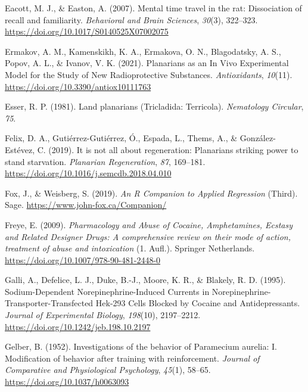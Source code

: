 \documentclass[
  jou,
  floatsintext,
  longtable,
  nolmodern,
  notxfonts,
  notimes,
  donotrepeattitle,
  colorlinks=true,linkcolor=blue,citecolor=blue,urlcolor=blue]{apa7}
\newlength{\cslhangindent}
\newenvironment{CSLReferences}[2] %
 {\begin{list}{}{%
  \setlength{\itemindent}{0pt}
  \setlength{\leftmargin}{0pt}
  \setlength{\parsep}{0pt}
  \ifodd #1
   \setlength{\leftmargin}{\cslhangindent}
   \setlength{\itemindent}{-1\cslhangindent}
  \fi
  \setlength{\itemsep}{#2\baselineskip}}}
 {\end{list}}
\begin{document}
\begin{CSLReferences}{1}{0}
Eacott, M. J., \& Easton, A. (2007). Mental time travel in the rat:
{Dissociation} of recall and familiarity. \emph{Behavioral and Brain
Sciences}, \emph{30}(3), 322--323.
\url{https://doi.org/10.1017/S0140525X07002075}

Ermakov, A. M., Kamenskikh, K. A., Ermakova, O. N., Blagodatsky, A. S.,
Popov, A. L., \& Ivanov, V. K. (2021). Planarians as an {In} {Vivo}
{Experimental} {Model} for the {Study} of {New} {Radioprotective}
{Substances}. \emph{Antioxidants}, \emph{10}(11).
\url{https://doi.org/10.3390/antiox10111763}

Esser, R. P. (1981). Land planarians ({Tricladida}: {Terricola}).
\emph{Nematology Circular}, \emph{75}.

Felix, D. A., Gutiérrez-Gutiérrez, Ó., Espada, L., Thems, A., \&
González-Estévez, C. (2019). It is not all about regeneration:
{Planarians} striking power to stand starvation. \emph{Planarian
Regeneration}, \emph{87}, 169--181.
\url{https://doi.org/10.1016/j.semcdb.2018.04.010}

Fox, J., \& Weisberg, S. (2019). \emph{An {R} {Companion} to {Applied}
{Regression}} (Third). Sage. \url{https://www.john-fox.ca/Companion/}

Freye, E. (2009). \emph{Pharmacology and {Abuse} of {Cocaine},
{Amphetamines}, {Ecstasy} and {Related} {Designer} {Drugs}: {A}
comprehensive review on their mode of action, treatment of abuse and
intoxication} (1. Aufl.). Springer Netherlands.
\url{https://doi.org/10.1007/978-90-481-2448-0}

Galli, A., Defelice, L. J., Duke, B.-J., Moore, K. R., \& Blakely, R. D.
(1995). Sodium-{Dependent} {Norepinephrine}-{Induced} {Currents} in
{Norepinephrine}-{Transporter}-{Transfected} {Hek}-293 {Cells} {Blocked}
by {Cocaine} and {Antidepressants}. \emph{Journal of Experimental
Biology}, \emph{198}(10), 2197--2212.
\url{https://doi.org/10.1242/jeb.198.10.2197}

Gelber, B. (1952). Investigations of the behavior of {Paramecium}
aurelia: {I}. {Modification} of behavior after training with
reinforcement. \emph{Journal of Comparative and Physiological
Psychology}, \emph{45}(1), 58--65.
\url{https://doi.org/10.1037/h0063093}


\end{CSLReferences}
\end{document}

